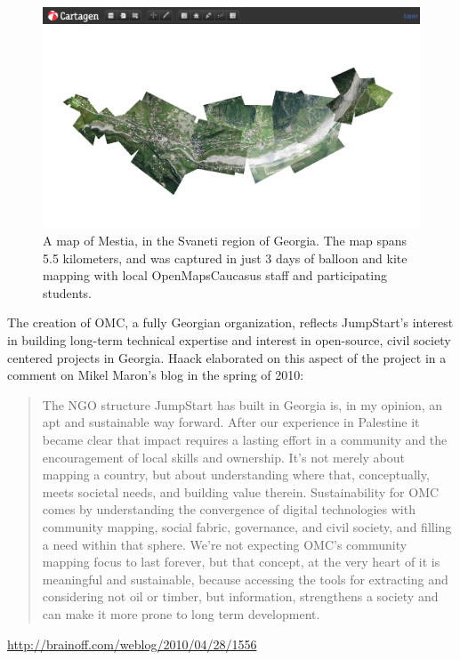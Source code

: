 \documentclass[11pt,oneside,notitlepage]{report}
\begin{document}
{{\begin{figure}[h]
  \begin{center}
	\includegraphics[width=1\textwidth]{images/mestia-cartagen.png}
	\caption{A map of Mestia, in the Svaneti region of Georgia. The map spans 5.5 kilometers, and was captured in just 3 days of balloon and kite mapping with local OpenMapsCaucasus staff and participating students.}
  \end{center}
\end{figure}

The creation of \ac{OMC}, a fully Georgian organization, reflects JumpStart's interest in building long-term technical expertise and interest in open-source, civil society centered projects in Georgia. Haack elaborated on this aspect of the project in a comment on Mikel Maron's blog in the spring of 2010: 

\begin{quote}The NGO structure JumpStart has built in Georgia is, in my opinion, an apt and sustainable way forward. After our experience in Palestine it became clear that impact requires a lasting effort in a community and the encouragement of local skills and ownership. It’s not merely about mapping a country, but about understanding where that, conceptually, meets societal needs, and building value therein. Sustainability for \ac{OMC} comes by understanding the convergence of digital technologies with community mapping, social fabric, governance, and civil society, and filling a need within that sphere. We’re not expecting \ac{OMC}’s community mapping focus to last forever, but that concept, at the very heart of it is meaningful and sustainable, because accessing the tools for extracting and considering not oil or timber, but information, strengthens a society and can make it more prone to long term development.\end{quote} \url{http://brainoff.com/weblog/2010/04/28/1556}

}}
\end{document}
